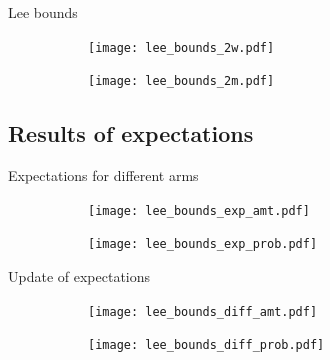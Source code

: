 \documentclass[8pt]{beamer}
\begin{document}
\begin{frame}{Lee bounds}

\begin{figure}[H]
    \caption{Lee Bounds}
    \label{lee_bounds}
    \begin{center}
        \begin{subfigure}{0.49\textwidth}
            \centering
            \texttt{[image: lee\_bounds\_2w.pdf]}
        \end{subfigure}
        \begin{subfigure}{0.49\textwidth}
                \centering
                \texttt{[image: lee\_bounds\_2m.pdf]}
        \end{subfigure}
    \end{center} 
\end{figure} 
 
\end{frame}

\subsection{Results of expectations}
\begin{frame}{Expectations for different arms}

\begin{figure}[H]
    \begin{center}
        \begin{subfigure}{0.49\textwidth}
            \centering
            \texttt{[image: lee\_bounds\_exp\_amt.pdf]}
        \end{subfigure}
        \begin{subfigure}{0.49\textwidth}
                \centering
                \texttt{[image: lee\_bounds\_exp\_prob.pdf]}
        \end{subfigure}
    \end{center} 
\end{figure} 
\end{frame}

\begin{frame}{Update of expectations}

\begin{figure}[H]
    \begin{center}
        \begin{subfigure}{0.49\textwidth}
            \centering
            \texttt{[image: lee\_bounds\_diff\_amt.pdf]}
        \end{subfigure}
        \begin{subfigure}{0.49\textwidth}
                \centering
                \texttt{[image: lee\_bounds\_diff\_prob.pdf]}
        \end{subfigure}
    \end{center} 
\end{figure} 
 
 
\end{frame}
\end{document}
